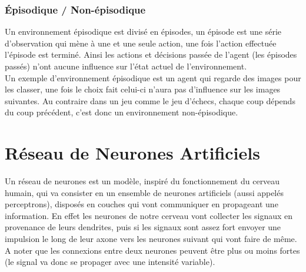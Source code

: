 \documentclass{article}
\begin{document}
\subsubsection{Épisodique / Non-épisodique}

Un environnement épisodique est divisé en épisodes, un épisode est une série d'observation qui mène à une et une seule action, une fois l'action effectuée l'épisode est terminé. Ainsi les actions et décisions passée de l'agent (les épisodes passés) n'ont aucune influence sur l'état actuel de l'environnement.\\
Un exemple d'environnement épisodique est un agent qui regarde des images pour les classer, une fois le choix fait celui-ci n'aura pas d'influence sur les images suivantes. Au contraire dans un jeu comme le jeu d'échecs, chaque coup dépends du coup précédent, c'est donc un environnement non-épisodique.\cite{tutoptai}

\newpage
\section{Réseau de Neurones Artificiels}

Un réseau de neurones est un modèle, inspiré du fonctionnement du cerveau humain, qui va consister en un ensemble de neurones artificiels (aussi appelés perceptrons), disposés en couches qui vont communiquer en propageant une information.\cite{wikiann} En effet les neurones de notre cerveau vont collecter les signaux en provenance de leurs dendrites, puis si les signaux sont assez fort envoyer une impulsion le long de leur axone vers les neurones suivant qui vont faire de même. A noter que les connexions entre deux neurones peuvent être plus ou moins fortes (le signal va donc se propager avec une intensité variable).\cite{neuronswork}
\end{document}
